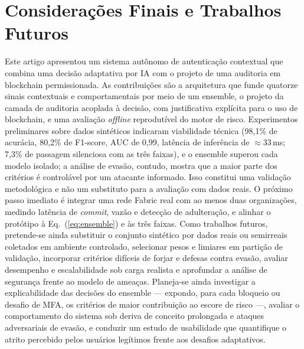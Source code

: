 \documentclass[conference]{IEEEtran}
\begin{document}
\section{Considerações Finais e Trabalhos Futuros}
\label{sec:conclusion}
Este artigo apresentou um sistema autônomo de autenticação contextual que
combina uma decisão adaptativa por IA com o projeto de uma auditoria
em blockchain permissionada. As contribuições são a arquitetura que
funde quatorze sinais contextuais e comportamentais por meio de um
ensemble, o projeto da camada de auditoria acoplada à decisão, com
justificativa explícita para o uso de blockchain, e uma avaliação
\emph{offline} reprodutível do motor de risco. Experimentos preliminares sobre
dados sintéticos indicaram viabilidade técnica (98,1\% de acurácia, 80,2\%
de F1-score, AUC de 0,99, latência de inferência de $\approx$33\,ms;
7,3\% de passagem silenciosa com as três faixas), e o ensemble superou
cada modelo isolado; a análise de evasão, contudo, mostra que a maior
parte dos critérios é controlável por um atacante informado. Isso
constitui uma validação metodológica e não um substituto para a
avaliação com dados reais. O próximo passo imediato é integrar uma rede
Fabric real com ao menos duas organizações, medindo latência de
\emph{commit}, vazão e detecção de adulteração, e alinhar o protótipo à
Eq.~(\ref{eq:ensemble}) e às três faixas. Como trabalhos futuros,
pretende-se ainda substituir
o conjunto sintético por dados reais ou semirreais coletados em ambiente
controlado, selecionar pesos e limiares em partição de validação,
incorporar critérios difíceis de forjar e defesas contra evasão, avaliar
desempenho e escalabilidade sob carga realista e aprofundar a análise de
segurança frente ao modelo de ameaças. Planeja-se ainda investigar a
explicabilidade das decisões do ensemble --- expondo, para cada bloqueio
ou desafio de MFA, os critérios de maior contribuição ao escore de
risco ---, avaliar o comportamento do sistema sob deriva de conceito
prolongada e ataques adversariais de evasão, e conduzir um estudo de
usabilidade que quantifique o atrito percebido pelos usuários legítimos
frente aos desafios adaptativos.
\end{document}
